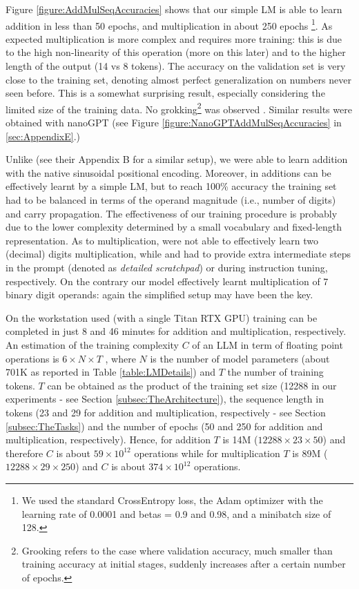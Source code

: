 \documentclass[final,1p,times,authoryear]{elsarticle}
\begin{document}
Figure \ref{figure:AddMulSeqAccuracies} shows that our simple LM is able to learn addition in less than 50 epochs, and multiplication in about 250 epochs \footnote{We used the standard CrossEntropy loss, the Adam optimizer with the learning rate of 0.0001 and betas = 0.9 and 0.98, and a minibatch size of 128.}. As expected multiplication is more complex and requires more training: this is due to the high non-linearity of this operation (more on this later) and to the higher length of the output (14 vs 8 tokens). The accuracy on the validation set is very close to the training set, denoting almost perfect generalization on numbers never seen before. This is a somewhat surprising result, especially considering the limited size of the training data. No grokking\footnote{Grooking refers to the case where validation accuracy, much smaller than training accuracy at initial stages, suddenly increases after a certain number of epochs.} was observed \citep{Nanda2023}. Similar results were obtained with nanoGPT (see Figure \ref{figure:NanoGPTAddMulSeqAccuracies} in \ref{sec:AppendixE}.)

Unlike \citet{Nogueira2021} (see their Appendix B for a  similar setup), we were able to learn addition with the native sinusoidal positional encoding. Moreover, in \citet{Lee2023} additions can be effectively learnt by a simple LM, but to reach 100\% accuracy the training set had to be balanced in terms of the operand magnitude (i.e., number of digits) and carry propagation. The effectiveness of our training procedure is probably due to the lower complexity determined by a small vocabulary and fixed-length representation. As to multiplication, \citet{Muffo2023} were not able to effectively learn two (decimal) digits multiplication, while \citet{Lee2023} and \citet{Liu2023} had to provide extra intermediate steps in the prompt (denoted as \textit{detailed scratchpad}) or during instruction tuning, respectively. On the contrary our model effectively learnt multiplication of 7 binary digit operands: again the simplified setup may have been the key.

On the workstation used (with a single Titan RTX GPU) training can be completed in just 8 and 46 minutes for addition and multiplication, respectively. An estimation of the training complexity $C$ of an LLM  in term of floating point operations is $6\times N\times T$ \citep{Kaplan2020}, where $N$ is the number of model parameters (about 701K as reported in Table \ref{table:LMDetails}) and $T$ the number of training tokens. $T$ can be obtained as the product of the training set size (12288 in our experiments - see Section \ref{subsec:TheArchitecture}), the sequence length in tokens (23 and 29 for addition and multiplication, respectively - see Section \ref{subsec:TheTasks}) and the number of epochs (50 and 250 for addition and multiplication, respectively). Hence, for addition $T$ is 14M ($12288 \times 23 \times 50$) and therefore $C$ is about $59 \times 10^{12}$ operations while for multiplication $T$ is 89M ($12288 \times 29 \times 250$) and $C$ is about $374 \times 10^{12}$ operations.
\end{document}
